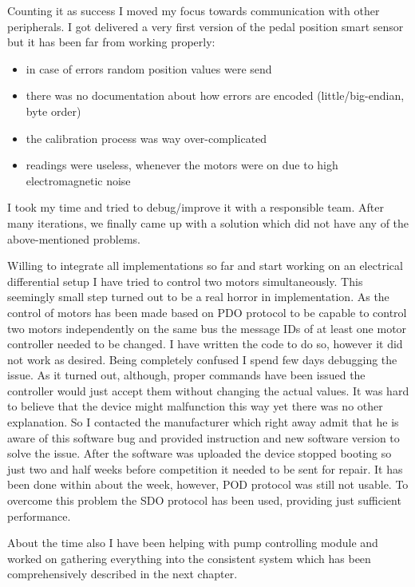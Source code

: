 Counting it as success I moved my focus towards communication with other peripherals. I got delivered a very first version of the pedal position smart sensor but it has been far from working properly:
\begin{itemize}
    \item in case of errors random position values were send
    \item there was no documentation about how errors are encoded (little/big-endian, byte order)
    \item the calibration process was way over-complicated
    \item readings were useless, whenever the motors were on due to high electromagnetic noise
\end{itemize} 
I took my time and tried to debug/improve it with a responsible team. After many iterations, we finally came up with a solution which did not have any of the above-mentioned problems.

Willing to integrate all implementations so far and start working on an electrical differential setup I have tried to control two motors simultaneously. This seemingly small step turned out to be a real horror in implementation.
As the control of motors has been made based on PDO protocol to be capable to control two motors independently on the same bus the message IDs of at least one motor controller needed to be changed. I have written the code to do so, however it did not work as desired. Being completely confused I spend few days debugging the issue. 
As it turned out, although, proper commands have been issued the controller would just accept them without changing the actual values. It was hard to believe that the device might malfunction this way yet there was no other explanation. So I contacted the manufacturer which right away admit that he is aware of this software bug and provided instruction and new software version to solve the issue.
After the software was uploaded the device stopped booting so just two and half weeks before competition it needed to be sent for repair. It has been done within about the week, however, POD protocol was still not usable.
To overcome this problem the SDO protocol has been used, providing just sufficient performance.

About the time also I have been helping with pump controlling module and worked on gathering everything into the consistent system which has been comprehensively described in the next chapter.